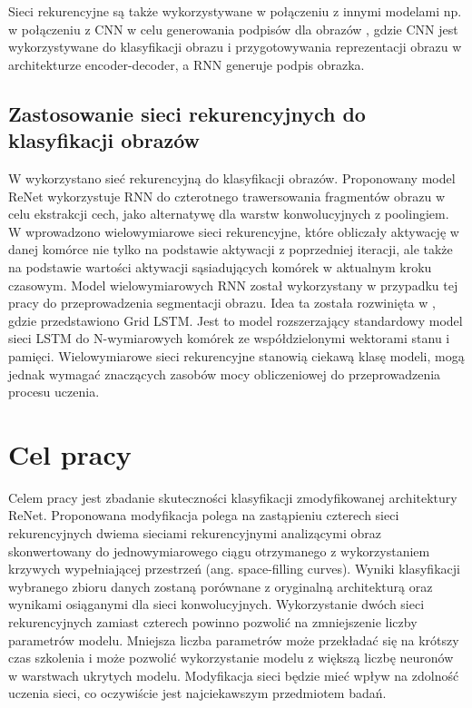 \documentclass[oneside, mag]{mgr}
\begin{document}
Sieci rekurencyjne są także wykorzystywane w połączeniu z innymi modelami np. w połączeniu z CNN w celu generowania podpisów dla obrazów \cite{DBLP:journals/corr/VinyalsTBE14}, gdzie CNN jest wykorzystywane do klasyfikacji obrazu i przygotowywania reprezentacji obrazu w architekturze encoder-decoder, a RNN generuje podpis obrazka.

\subsection{Zastosowanie sieci rekurencyjnych do klasyfikacji obrazów}

W \cite{DBLP:journals/corr/VisinKCMCB15} wykorzystano sieć rekurencyjną do klasyfikacji obrazów. Proponowany model ReNet wykorzystuje RNN do czterotnego trawersowania fragmentów obrazu w celu ekstrakcji cech, jako alternatywę dla warstw konwolucyjnych z poolingiem. W \cite{DBLP:journals/corr/abs-0705-2011} wprowadzono wielowymiarowe sieci rekurencyjne, które obliczały aktywację w danej komórce nie tylko na podstawie aktywacji z poprzedniej iteracji, ale także na podstawie wartości aktywacji sąsiadujących komórek w aktualnym kroku czasowym. Model wielowymiarowych RNN został wykorzystany w przypadku tej pracy do przeprowadzenia segmentacji obrazu. Idea ta została rozwinięta w \cite{DBLP:journals/corr/KalchbrennerDG15}, gdzie przedstawiono Grid LSTM. Jest to model rozszerzający standardowy model sieci LSTM do N-wymiarowych komórek ze współdzielonymi wektorami stanu i pamięci. Wielowymiarowe sieci rekurencyjne stanowią ciekawą klasę modeli, mogą jednak wymagać znaczących zasobów mocy obliczeniowej do przeprowadzenia procesu uczenia.

\section{Cel pracy}

Celem pracy jest zbadanie skuteczności klasyfikacji zmodyfikowanej architektury ReNet. Proponowana modyfikacja polega na zastąpieniu czterech sieci rekurencyjnych dwiema sieciami rekurencyjnymi analizącymi obraz skonwertowany do jednowymiarowego ciągu otrzymanego z wykorzystaniem krzywych wypełniającej przestrzeń (ang. space-filling curves). Wyniki klasyfikacji wybranego zbioru danych zostaną porównane z oryginalną architekturą oraz wynikami osiąganymi dla sieci konwolucyjnych. Wykorzystanie dwóch sieci rekurencyjnych zamiast czterech powinno pozwolić na zmniejszenie liczby parametrów modelu. Mniejsza liczba parametrów może przekładać się na krótszy czas szkolenia i może pozwolić wykorzystanie modelu z większą liczbę neuronów w warstwach ukrytych modelu. Modyfikacja sieci będzie mieć wpływ na zdolność uczenia sieci, co oczywiście jest najciekawszym przedmiotem badań. 
\end{document}
